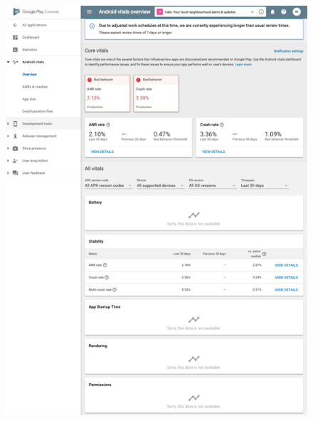 \begin{figure}[htbp!]
\centering
\begin{minipage}{.45\textwidth}
  \centering
  \includegraphics[width=\textwidth]{images/localhalo/apphealthoverviewplace_5550596_high_errors.png}
\end{minipage}\hfill%
\begin{minipage}{.45\textwidth}
  \centering

\end{minipage}
\end{figure}
